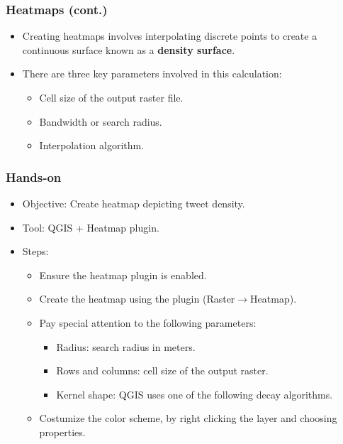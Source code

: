 \documentclass[hyperref={pdfpagelabels=true}]{beamer}
\begin{document}
\begin{frame}
\frametitle{Heatmaps (cont.)}

\begin{itemize}
      \item<1->Creating heatmaps involves interpolating discrete points to create a continuous surface known as a \textbf{density surface}. 
      \item<2->There are three key parameters involved in this calculation:
  \begin{itemize}
	\item<3->Cell size of the output raster file.%
	\item<3->Bandwidth or search radius.%
	\item<3->Interpolation algorithm.%
	
  \end{itemize}
\end{itemize}
\end{frame}


\begin{frame}
\frametitle{Hands-on}
\begin{itemize}
  \item<1->Objective: Create heatmap depicting tweet density.
  \item<1->Tool: QGIS + Heatmap plugin.
  \item<1->Steps:  
  \begin{itemize}
    \item<2->Ensure the heatmap plugin is enabled.  
    \item<2->Create the heatmap using the plugin (Raster$\rightarrow$Heatmap).
    \item<2->Pay special attention to the following parameters:    
    \begin{itemize}
      \item<3->Radius: search radius in meters.
      \item<3->Rows and columns: cell size of the output raster.
      \item<3->Kernel shape: QGIS uses one of the following decay algorithms.      
    \end{itemize}        
    \item<4->Costumize the color scheme, by right clicking the layer and choosing properties.
  \end{itemize}    
\end{itemize}  
\end{frame}
\end{document}
